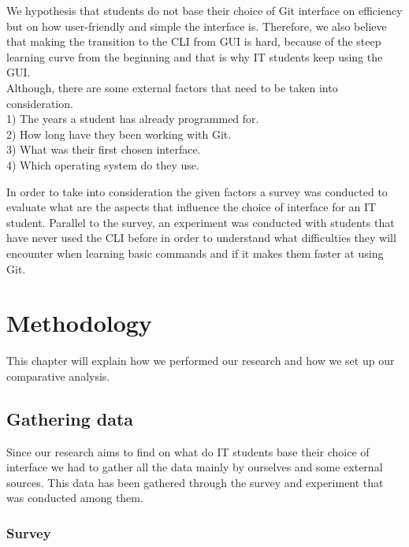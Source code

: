 \documentclass[]{report}
\begin{document}
	We hypothesis that students do not base their choice of Git interface on efficiency but on how user-friendly and simple the interface is. Therefore, we also believe that making the transition to the CLI from GUI is hard, because of the steep learning curve from the beginning and that is why IT students keep using the GUI.\\
	Although, there are some external factors that need to be taken into consideration. \\1) The years a student has already programmed for.\\2) How long have they been working with Git. \\3) What was their first chosen interface.\\4) Which operating system do they use. 
	
	In order to take into consideration the given factors a survey was conducted to evaluate what are the aspects that influence the choice of interface for an IT student. Parallel to the survey, an experiment was conducted with students that have never used the CLI before in order to understand what difficulties they will encounter when learning basic commands and if it makes them faster at using Git. 
	
	\section{Methodology}
	This chapter will explain how we performed our research and how we set up our comparative analysis.
	
	\subsection{Gathering data}
	Since our research aims to find  on what do IT students base their choice of interface we had to gather all the data mainly by ourselves and some external sources.  This data has been gathered through the survey and experiment that was conducted among them.
	\subsubsection{Survey}
	
\end{document}
